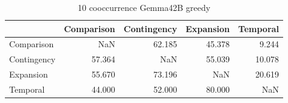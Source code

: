 \begin{table}
\caption{10 cooccurrence Gemma42B greedy}
\begin{tabular}{lrrrr}
\toprule
 & Comparison & Contingency & Expansion & Temporal \\
\midrule
Comparison & NaN & 62.185 & 45.378 & 9.244 \\
Contingency & 57.364 & NaN & 55.039 & 10.078 \\
Expansion & 55.670 & 73.196 & NaN & 20.619 \\
Temporal & 44.000 & 52.000 & 80.000 & NaN \\
\bottomrule
\end{tabular}
\end{table}
